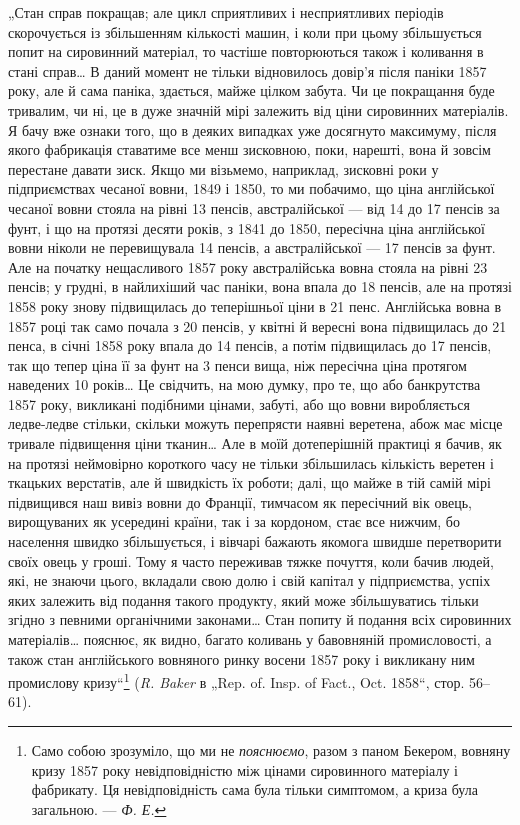 
„Стан справ покращав; але цикл сприятливих і несприятливих
періодів скорочується із збільшенням кількості машин, і
коли при цьому збільшується попит на сировинний матеріал,
то частіше повторюються також і коливання в стані справ\dots{}
В даний момент не тільки відновилось довір’я після паніки
1857 року, але й сама паніка, здається, майже цілком забута.
Чи це покращання буде тривалим, чи ні, це в дуже значній
мірі залежить від ціни сировинних матеріалів. Я бачу вже ознаки
того, що в деяких випадках уже досягнуто максимуму, після
якого фабрикація ставатиме все менш зисковною, поки, нарешті,
вона й зовсім перестане давати зиск. Якщо ми візьмемо, наприклад,
зисковні роки у підприємствах чесаної вовни, 1849 і 1850,
то ми побачимо, що ціна англійської чесаної вовни стояла на
рівні 13 пенсів, австралійської — від 14 до 17 пенсів за фунт,
і що на протязі десяти років, з 1841 до 1850, пересічна ціна
англійської вовни ніколи не перевищувала 14 пенсів, а австралійської
— 17 пенсів за фунт. Але на початку нещасливого
1857 року австралійська вовна стояла на рівні 23 пенсів; у грудні,
в найлихіший час паніки, вона впала до 18 пенсів, але на протязі
1858 року знову підвищилась до теперішньої ціни в 21 пенс.
Англійська вовна в 1857 році так само почала з 20 пенсів, у квітні
й вересні вона підвищилась до 21 пенса, в січні 1858 року впала
до 14 пенсів, а потім підвищилась до 17 пенсів, так що тепер
ціна її за фунт на 3 пенси вища, ніж пересічна ціна протягом
наведених 10 років\dots{} Це свідчить, на мою думку, про те, що або
банкрутства 1857 року, викликані подібними цінами, забуті, або
що вовни виробляється ледве-ледве стільки, скільки можуть
перепрясти наявні веретена, абож має місце тривале підвищення
ціни тканин\dots{} Але в моїй дотеперішній практиці я бачив,
як на протязі неймовірно короткого часу не тільки збільшилась
кількість веретен і ткацьких верстатів, але й швидкість
їх роботи; далі, що майже в тій самій мірі підвищився наш вивіз
вовни до Франції, тимчасом як пересічний вік овець, вирощуваних
як усередині країни, так і за кордоном, стає все нижчим,
бо населення швидко збільшується, і вівчарі бажають якомога
швидше перетворити своїх овець у гроші. Тому я часто переживав
тяжке почуття, коли бачив людей, які, не знаючи цього, вкладали
свою долю і свій капітал у підприємства, успіх яких залежить від
подання такого продукту, який може збільшуватись тільки
згідно з певними органічними законами\dots{} Стан попиту й подання
всіх сировинних матеріалів\dots{} пояснює, як видно, багато коливань
у бавовняній промисловості, а також стан англійського вовняного
ринку восени 1857 року і викликану ним промислову кризу“\footnote{Само собою зрозуміло, що ми не \emph{пояснюємо}, разом з паном Бекером,
вовняну кризу 1857 року невідповідністю між цінами сировинного матеріалу
і фабрикату. Ця невідповідність сама була тільки симптомом, а криза була
загальною. — \emph{Ф. Е.}}
(\emph{R. Baker} в „Rep. of. Insp. of Fact., Oct. 1858“, стор. 56--61).
